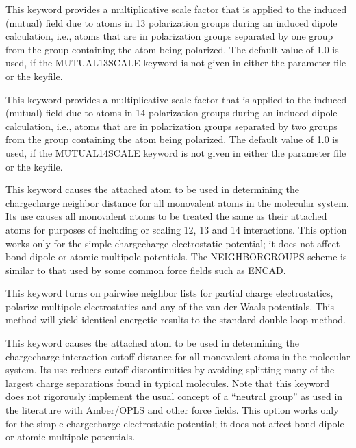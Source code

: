 \documentclass[letterpaper,11pt,english]{sphinxmanual}
\begin{document}
  This keyword provides a multiplicative scale factor that is applied to the induced (mutual) field due to atoms in 1\sphinxhyphen{}3 polarization groups during an induced dipole calculation, i.e., atoms that are in polarization groups separated by one group from the group containing the atom being polarized. The default value of 1.0 is used, if the MUTUAL\sphinxhyphen{}13\sphinxhyphen{}SCALE keyword is not given in either the parameter file or the keyfile.

  This keyword provides a multiplicative scale factor that is applied to the induced (mutual) field due to atoms in 1\sphinxhyphen{}4 polarization groups during an induced dipole calculation, i.e., atoms that are in polarization groups separated by two groups from the group containing the atom being polarized. The default value of 1.0 is used, if the MUTUAL\sphinxhyphen{}14\sphinxhyphen{}SCALE keyword is not given in either the parameter file or the keyfile.

  This keyword causes the attached atom to be used in determining the charge\sphinxhyphen{}charge neighbor distance for all monovalent atoms in the molecular system. Its use causes all monovalent atoms to be treated the same as their attached atoms for purposes of including or scaling 1\sphinxhyphen{}2, 1\sphinxhyphen{}3 and 1\sphinxhyphen{}4 interactions. This option works only for the simple charge\sphinxhyphen{}charge electrostatic potential; it does not affect bond dipole or atomic multipole potentials. The NEIGHBOR\sphinxhyphen{}GROUPS scheme is similar to that used by some common force fields such as ENCAD.

  This keyword turns on pairwise neighbor lists for partial charge electrostatics, polarize multipole electrostatics and any of the van der Waals potentials. This method will yield identical energetic results to the standard double loop method.

  This keyword causes the attached atom to be used in determining the charge\sphinxhyphen{}charge interaction cutoff distance for all monovalent atoms in the molecular system. Its use reduces cutoff discontinuities by avoiding splitting many of the largest charge separations found in typical molecules. Note that this keyword does not rigorously implement the usual concept of a “neutral group” as used in the literature with Amber/OPLS and other force fields. This option works only for the simple charge\sphinxhyphen{}charge electrostatic potential; it does not affect bond dipole or atomic multipole potentials.
\end{document}
